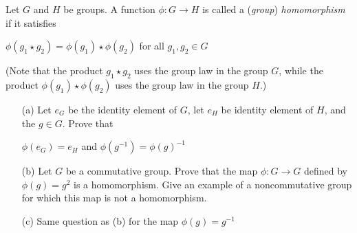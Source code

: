 \begin{exer}[2.13]
Let $G$ and $H$ be groups. A function $\phi: G \rightarrow H$ is called a (\textit{group}) \textit{homomorphism} if it satisfies

\begin{center}
    $\phi(g_1 \star g_2) = \phi(g_1) \star \phi(g_2)$ for all $g_1, g_2 \in G$
\end{center}

(Note that the product $g_1 \star g_2$ uses the group law in the group $G$, while the product $\phi(g_1) \star \phi(g_2)$ uses the group law in the group $H$.)

\begin{enumerate}
    \item [(a)] Let $e_G$ be the identity element of $G$, let $e_H$ be identity element of $H$, and the $g \in G$. Prove that
    \begin{center}
        $\phi(e_G) = e_H$ \quad\quad and \quad\quad $\phi(g^{-1}) = \phi(g)^{-1}$
    \end{center}
    \item [(b)] Let $G$ be a commutative group. Prove that the map $\phi: G \rightarrow G$ defined by $\phi(g)=g^2$ is a homomorphism. Give an example of a noncommutative group for which this map is not a homomorphism.
    \item [(c)] Same question as (b) for the map $\phi(g)=g^{-1}$
\end{enumerate}
\end{exer}


